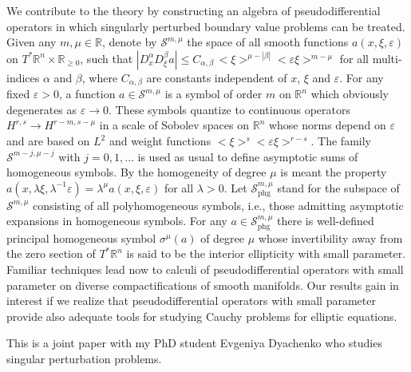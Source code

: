 \documentclass[10pt,a4paper]{article}
\def\R{\mathbb{R}}
\begin{document}
We contribute to the theory by constructing an algebra of pseudodifferential operators in which singularly perturbed boundary value problems can be treated.
Given any $m, \mu \in \R$, denote by
$\mathcal{S}^{m,\mu}$
the space of all smooth functions $a (x,\xi,\varepsilon)$ on
$T^\ast \R^n \times \R_{\geq 0}$,
such that
$
|D^\alpha_x D^\beta_\xi a|
\leq
C_{\alpha,\beta}\, <\xi>^{\mu-|\beta|} <\varepsilon \xi>^{m-\mu}
$
for all multi-indices $\alpha$ and $\beta$, where
$C_{\alpha,\beta}$ are constants independent of $x$, $\xi$ and $\varepsilon$.
For any fixed $\varepsilon > 0$, a function $a \in \mathcal{S}^{m,\mu}$ is a symbol of order $m$ on $\R^n$ which obviously degenerates as $\varepsilon \to 0$.
These symbols quantize to continuous operators
$H^{r,s} \to H^{r-m,s-\mu}$
in a scale of Sobolev spaces on $\R^n$ whose norms depend on $\varepsilon$ and are based on $L^2$ and weight functions
$<\xi>^{s} <\varepsilon \xi>^{r-s}$.
The family $\mathcal{S}^{m-j,\mu-j}$ with $j = 0, 1, \ldots$ is used as usual to define asymptotic sums of homogeneous symbols.
By the homogeneity of degree $\mu$ is meant the property
$
a (x, \lambda \xi, \lambda^{-1} \varepsilon)
= \lambda^\mu a (x, \xi, \varepsilon)
$
for all $\lambda > 0$.
Let $\mathcal{S}^{m,\mu}_{\mathrm{phg}}$ stand for the subspace of
$\mathcal{S}^{m,\mu}$
consisting of all polyhomogeneous symbols, i.e., those admitting asymptotic expansions in homogeneous symbols.
For any $a \in \mathcal{S}^{m,\mu}_{\mathrm{phg}}$ there is well-defined principal homogeneous symbol $\sigma^\mu (a)$ of degree $\mu$ whose invertibility away from the zero section of $T^\ast \R^n$ is said to be the interior ellipticity with small parameter.
%
Familiar techniques lead now to calculi of pseudodifferential operators with small parameter on diverse compactifications of smooth manifolds.
Our results gain in interest if we realize that pseudodifferential operators with small parameter provide also adequate tools for studying Cauchy problems for elliptic equations.

This is a joint paper with my PhD student Evgeniya Dyachenko who studies singular perturbation problems.

%
\end{document}
